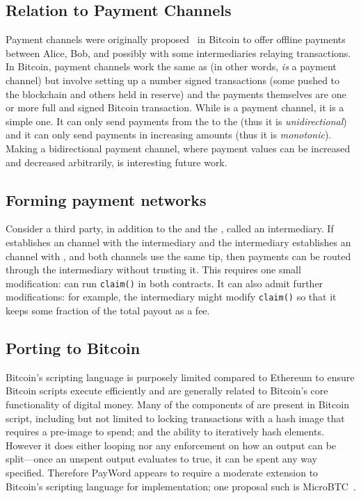 \subsection{Relation to Payment Channels}
\label{sec:pcn}

Payment channels were originally proposed~\cite{DW15,PD15} in Bitcoin to offer offline payments between Alice, Bob, and possibly with some intermediaries relaying transactions. In Bitcoin, payment channels work the same as \ew (in other words, \ew \textit{is} a payment channel) but involve setting up a number signed transactions (some pushed to the blockchain and others held in reserve) and the payments themselves are one or more full and signed Bitcoin transaction. While \ew is a payment channel, it is a simple one. It can only send payments from the \make to the \take (thus it is \textit{unidirectional}) and it can only send payments in increasing amounts (thus it is \textit{monotonic}). Making a bidirectional payment channel, where payment values can be increased and decreased arbitrarily, is interesting future work.

\subsection{Forming payment networks} 

Consider a third party, in addition to the \make and the \take, called an intermediary. If \make establishes an \ew channel with the intermediary and the intermediary establishes an \ew channel with \take, and both channels use the same tip, then payments can be routed through the intermediary without trusting it. This requires one small modification: \take can run \texttt{claim()} in both contracts. It can also admit further modifications: for example, the intermediary might modify \texttt{claim()} so that it keeps some fraction of the total payout as a fee.

\subsection{Porting to Bitcoin}

Bitcoin's scripting language is purposely limited compared to Ethereum to ensure Bitcoin scripts execute efficiently and are generally related to Bitcoin's core functionality of digital money. Many of the components of \pw are present in Bitcoin script, including but not limited to locking transactions with a hash image that requires a pre-image to spend; and the ability to iteratively hash elements. However it does either looping nor any enforcement on how an output can be split---\ie once an unspent output evaluates to true, it can be spent any way specified. Therefore PayWord appears to require a moderate extension to Bitcoin's scripting language for implementation; one proposal such is MicroBTC~\cite{Wan18}.


